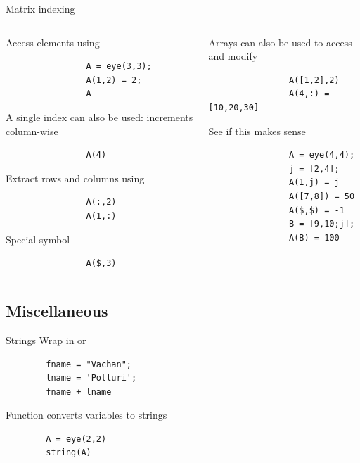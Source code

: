 \begin{frame}[fragile]{Matrix indexing}
    \begin{columns}
        \begin{column}{0.49\linewidth}
            Access elements using 
            \begin{lstlisting}
                A = eye(3,3);
                A(1,2) = 2;
                A
            \end{lstlisting}
            A single index can also be used: increments column-wise
            \begin{lstlisting}
                A(4)
            \end{lstlisting}
            Extract rows and columns using \inlinecode{:}
            \begin{lstlisting}
                A(:,2)
                A(1,:)
            \end{lstlisting}
            Special symbol \inlinecode{\$}
            \begin{lstlisting}
                A($,3)
            \end{lstlisting}
        \end{column}
        \begin{column}{0.49\linewidth}
            Arrays can also be used to access and modify
            \begin{lstlisting}
                A([1,2],2)
                A(4,:) = [10,20,30]
            \end{lstlisting}
            See if this makes sense
            \begin{lstlisting}
                A = eye(4,4);
                j = [2,4];
                A(1,j) = j
                A([7,8]) = 50
                A($,$) = -1
                B = [9,10;j];
                A(B) = 100
            \end{lstlisting}
        \end{column}
    \end{columns}
\end{frame}

\subsection{Miscellaneous}
\begin{frame}[fragile]{Strings}
    Wrap in  or 
    \begin{lstlisting}
        fname = "Vachan";
        lname = 'Potluri';
        fname + lname
    \end{lstlisting}
    Function  converts variables to strings
    \begin{lstlisting}
        A = eye(2,2)
        string(A)
    \end{lstlisting}
\end{frame}

